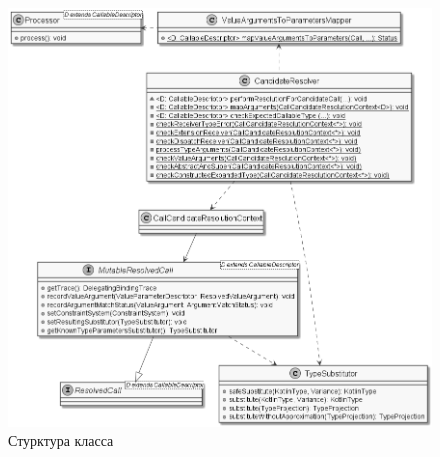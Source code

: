 \begin{figure}[htbp]
    \centering
    \includegraphics[width=\textwidth]{resources/06/13_candidate_resolver.png}
    \caption{Стурктура класса }
    \label{fig:candidate-resolver}
\end{figure}


